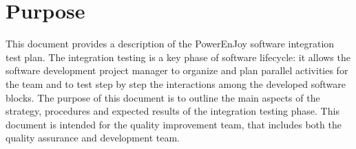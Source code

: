 
\section{Purpose}

This document provides a description of the PowerEnJoy software integration test plan.
The integration testing is a key phase of software lifecycle: it allows the software development project manager to organize and plan parallel activities for the team and to test step by step the interactions among the developed software blocks.
The purpose of this document is to outline the main aspects of the strategy, procedures and expected results of the integration testing phase.
This document is intended for the quality improvement team, that includes both the quality assurance and development team.